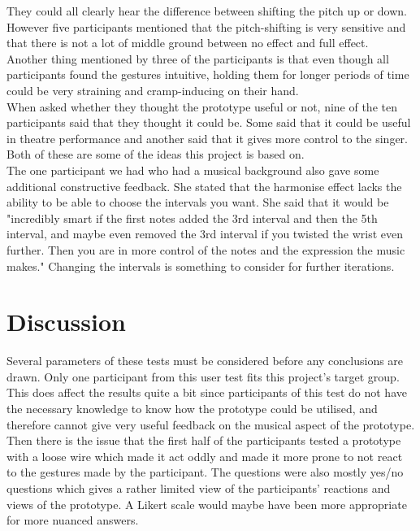 They could all clearly hear the difference between shifting the pitch up or down. However five participants mentioned that the pitch-shifting is very sensitive and that there is not a lot of middle ground between no effect and full effect. \\

Another thing mentioned by three of the participants is that even though all participants found the gestures intuitive, holding them for longer periods of time could be very straining and cramp-inducing on their hand. \\

When asked whether they thought the prototype useful or not, nine of the ten participants said that they thought it could be. Some said that it could be useful in theatre performance and another said that it gives more control to the singer. Both of these are some of the ideas this project is based on. \\

The one participant we had who had a musical background also gave some additional constructive feedback. She stated that the harmonise effect lacks the ability to be able to choose the intervals you want. She said that it would be "incredibly smart if the first notes added the 3rd interval and then the 5th interval, and maybe even removed the 3rd interval if you twisted the wrist even further. Then you are in more control of the notes and the expression the music makes." Changing the intervals is something to consider for further iterations. 

\section{Discussion}
Several parameters of these tests must be considered before any conclusions are drawn. Only one participant from this user test fits this project's target group. This does affect the results quite a bit since participants of this test  do not have the necessary knowledge to know how the prototype could be utilised, and therefore cannot give very useful feedback on the musical aspect of the prototype.
Then there is the issue that the first half of the participants tested a prototype with a loose wire which made it act oddly and made it more prone to not react to the gestures made by the participant. The questions were also mostly yes/no questions which gives a rather limited view of the participants' reactions and views of the prototype. A Likert scale would maybe have been more appropriate for more nuanced answers.


